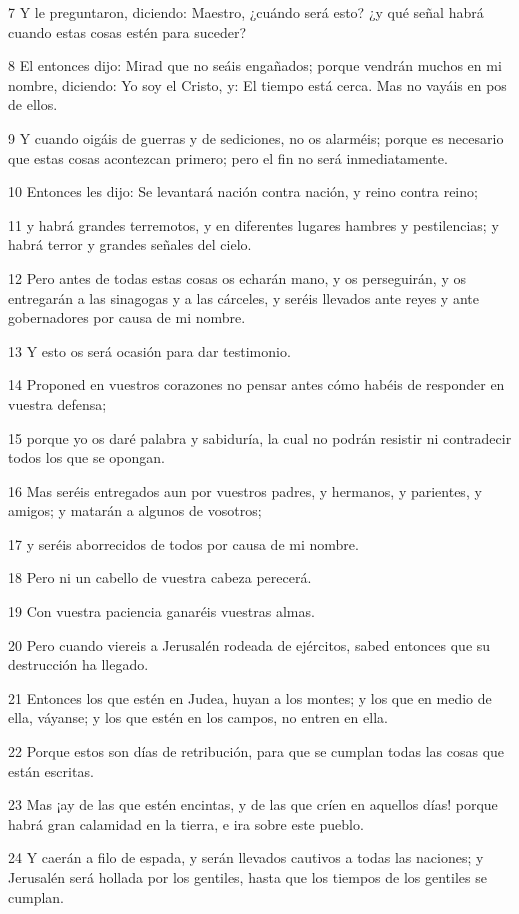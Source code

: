 \par 7 Y le preguntaron, diciendo: Maestro, ¿cuándo será esto? ¿y qué señal habrá cuando estas cosas estén para suceder?
\par 8 El entonces dijo: Mirad que no seáis engañados; porque vendrán muchos en mi nombre, diciendo: Yo soy el Cristo, y: El tiempo está cerca. Mas no vayáis en pos de ellos.
\par 9 Y cuando oigáis de guerras y de sediciones, no os alarméis; porque es necesario que estas cosas acontezcan primero; pero el fin no será inmediatamente.
\par 10 Entonces les dijo: Se levantará nación contra nación, y reino contra reino;
\par 11 y habrá grandes terremotos, y en diferentes lugares hambres y pestilencias; y habrá terror y grandes señales del cielo.
\par 12 Pero antes de todas estas cosas os echarán mano, y os perseguirán, y os entregarán a las sinagogas y a las cárceles, y seréis llevados ante reyes y ante gobernadores por causa de mi nombre.
\par 13 Y esto os será ocasión para dar testimonio.
\par 14 Proponed en vuestros corazones no pensar antes cómo habéis de responder en vuestra defensa;
\par 15 porque yo os daré palabra y sabiduría, la cual no podrán resistir ni contradecir todos los que se opongan.
\par 16 Mas seréis entregados aun por vuestros padres, y hermanos, y parientes, y amigos; y matarán a algunos de vosotros;
\par 17 y seréis aborrecidos de todos por causa de mi nombre.
\par 18 Pero ni un cabello de vuestra cabeza perecerá.
\par 19 Con vuestra paciencia ganaréis vuestras almas.
\par 20 Pero cuando viereis a Jerusalén rodeada de ejércitos, sabed entonces que su destrucción ha llegado.
\par 21 Entonces los que estén en Judea, huyan a los montes; y los que en medio de ella, váyanse; y los que estén en los campos, no entren en ella.
\par 22 Porque estos son días de retribución, para que se cumplan todas las cosas que están escritas.
\par 23 Mas ¡ay de las que estén encintas, y de las que críen en aquellos días! porque habrá gran calamidad en la tierra, e ira sobre este pueblo.
\par 24 Y caerán a filo de espada, y serán llevados cautivos a todas las naciones; y Jerusalén será hollada por los gentiles, hasta que los tiempos de los gentiles se cumplan.

